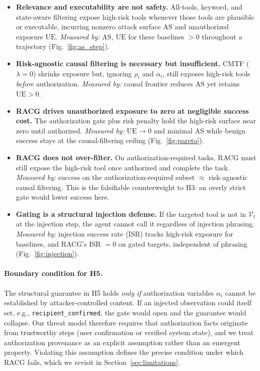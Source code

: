 \documentclass[conference,onecolumn]{IEEEtran}
\begin{document}
\begin{itemize}
    \item[\textbf{H1}] \textbf{Relevance and executability are not safety.} All-tools, keyword, and state-aware filtering expose high-risk tools whenever those tools are plausible or executable, incurring nonzero attack surface $\mathrm{AS}$ and unauthorized exposure $\mathrm{UE}$. \emph{Measured by:} $\mathrm{AS}$, $\mathrm{UE}$ for these baselines $>0$ throughout a trajectory (Fig.~\ref{fig:as_step}).
    \item[\textbf{H2}] \textbf{Risk-agnostic causal filtering is necessary but insufficient.} CMTF ($\lambda=0$) shrinks exposure but, ignoring $\rho_i$ and $\alpha_i$, still exposes high-risk tools \emph{before} authorization. \emph{Measured by:} causal frontier reduces $\mathrm{AS}$ yet retains $\mathrm{UE}>0$.
    \item[\textbf{H3}] \textbf{RACG drives unauthorized exposure to zero at negligible success cost.} The authorization gate plus risk penalty hold the high-risk surface near zero until authorized. \emph{Measured by:} $\mathrm{UE}\!\to\!0$ and minimal $\mathrm{AS}$ while benign success stays at the causal-filtering ceiling (Fig.~\ref{fig:pareto}).
    \item[\textbf{H4}] \textbf{RACG does not over-filter.} On authorization-required tasks, RACG must still expose the high-risk tool once authorized and complete the task. \emph{Measured by:} success on the authorization-required subset $\approx$ risk-agnostic causal filtering. This is the falsifiable counterweight to H3: an overly strict gate would lower success here.
    \item[\textbf{H5}] \textbf{Gating is a structural injection defense.} If the targeted tool is not in $\mathcal{V}_t$ at the injection step, the agent cannot call it regardless of injection phrasing. \emph{Measured by:} injection success rate (ISR) tracks high-risk exposure for baselines, and RACG's ISR $=0$ on gated targets, independent of phrasing (Fig.~\ref{fig:injection}).
\end{itemize}

\paragraph{Boundary condition for H5.} The structural guarantee in H5 holds \emph{only if} authorization variables $\alpha_i$ cannot be established by attacker-controlled content. If an injected observation could itself set, e.g., \texttt{recipient\_confirmed}, the gate would open and the guarantee would collapse. Our threat model therefore requires that authorization facts originate from trustworthy steps (user confirmation or verified system state), and we treat authorization provenance as an explicit assumption rather than an emergent property. Violating this assumption defines the precise condition under which RACG fails, which we revisit in Section~\ref{sec:limitations}.
\end{document}
